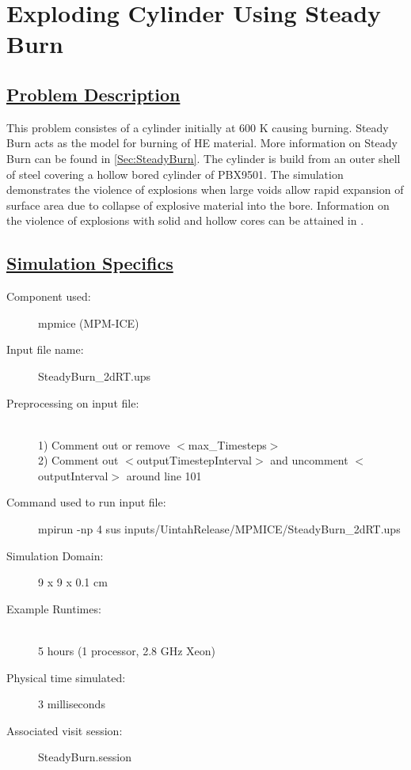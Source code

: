 \newpage


%
\section*{\center Exploding Cylinder Using Steady Burn}
\subsection*{\underline{Problem Description}}
This problem consistes of a cylinder initially at 600 K causing burning.  Steady Burn acts as the model for burning of HE material.  More information on Steady Burn can be found in \ref{Sec:SteadyBurn}.  The cylinder is build from an outer shell of steel covering a hollow bored cylinder of PBX9501.  The simulation demonstrates the violence of explosions when large voids allow rapid expansion of surface area due to collapse of explosive material into the bore.  Information on the violence of explosions with solid and hollow cores can be attained in \cite{ref:wighteddings}.  

\subsection*{\underline{Simulation Specifics}}
\begin{description}
\item [Component used:] \hfill mpmice (MPM-ICE)
\item [Input file name:] \hfill SteadyBurn\_2dRT.ups
\item [Preprocessing on input file:]\hfill \\ 1) Comment out or remove $<$max\_Timesteps$>$ \\ 2) Comment out $<$outputTimestepInterval$>$ and uncomment $<$outputInterval$>$ around line 101 \\
\item [Command used to run input file:]\hfill mpirun -np 4 sus inputs/UintahRelease/MPMICE/SteadyBurn\_2dRT.ups

\item [Simulation Domain:]\hfill    9 x 9 x 0.1 cm

\item [Example Runtimes:] \hfill \\
 5 hours   (1 processor, 2.8 GHz Xeon)

\item [Physical time simulated:] \hfill 3 milliseconds \\ 


\item [Associated visit session:] \hfill SteadyBurn.session

\end{description}

